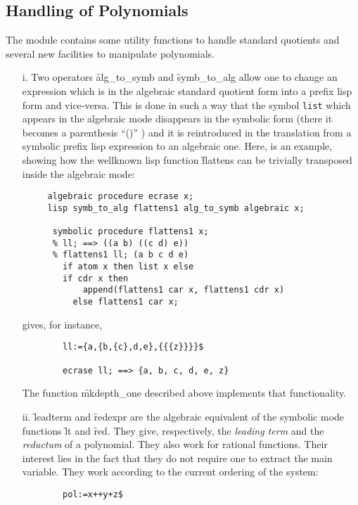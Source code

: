 \subsection{Handling of Polynomials}
The module contains some utility functions to handle
standard quotients and several new facilities to manipulate polynomials.
\begin{itemize}
\item[i.]
\hypertarget{operator:ALG_TO_SYMB}{}
\hypertarget{operator:SYMB_TO_ALG}{}
Two operators \f{alg\_to\_symb} and \f{symb\_to\_alg}
allow one to change an expression which is in the algebraic standard
quotient form into a prefix lisp form and vice-versa. This is done
in such a way that the symbol \texttt{list} which appears in the
algebraic mode disappears in the symbolic form (there it becomes
a parenthesis ``()'' ) and it is reintroduced in the translation
from a symbolic prefix lisp expression  to an algebraic one.
Here, is an example, showing how the wellknown lisp function
\f{flattens} can be trivially transposed inside the algebraic mode:
\begin{verbatim}
     algebraic procedure ecrase x;
     lisp symb_to_alg flattens1 alg_to_symb algebraic x;

      symbolic procedure flattens1 x;
      % ll; ==> ((a b) ((c d) e))
      % flattens1 ll; (a b c d e)
        if atom x then list x else
        if cdr x then
            append(flattens1 car x, flattens1 cdr x)
          else flattens1 car x;
\end{verbatim}
gives, for instance,
\begin{verbatim}
        ll:={a,{b,{c},d,e},{{{z}}}}$

        ecrase ll; ==> {a, b, c, d, e, z}
\end{verbatim}
The function \f{mkdepth\_one} described above implements that functionality.
\item[ii.]
\hypertarget{operator:LEADTERM}{}
\hypertarget{operator:REDEXPR}{}
\f{leadterm} and \f{redexpr} are the algebraic equivalent of the
symbolic mode functions \f{lt} and \f{red}. They give, respectively, the
\emph{leading term} and the \emph{reductum} of a polynomial. They also work
for rational functions. Their interest lies in the fact that they do not
require one to extract the main variable. They work according to the current
ordering of the system:
\begin{verbatim}
        pol:=x++y+z$


\end{verbatim}
\end{itemize}
